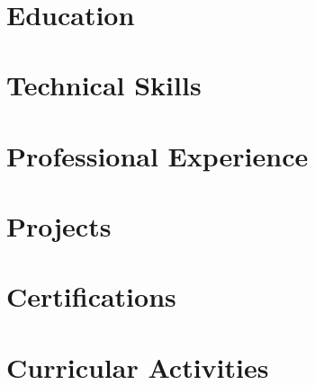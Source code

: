 \documentclass[10pt,a4paper,calibri]{moderncv}
\begin{document}
\maketitle\

\vspace{-48pt}

\section{Education}


\section{Technical Skills}


\section{Professional Experience}


\section{Projects}


\section{Certifications}


\section{Curricular Activities}

\end{document}
